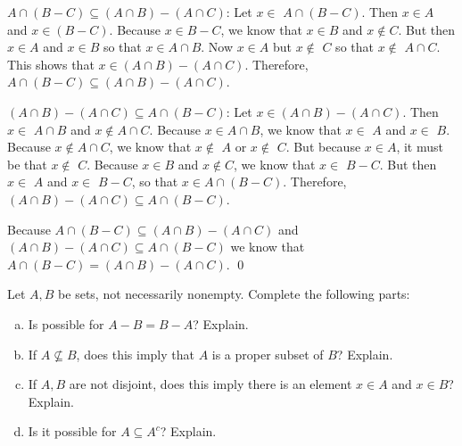 \documentclass[11pt,letterpaper]{article}
\newcommand{\ansun}[2]{\underline{\hspace{#1}#2\hspace{#1}}} %
\begin{document}
$A \cap (B - C) \subseteq (A \cap B) - (A \cap C)$: Let $x \in $ \ansun{0.45cm}{$A \cap (B - C)$}. Then \ansun{1.0cm}{$x \in A$} and \pspace \ansun{0.45cm}{$x \in (B - C)$}. Because $x \in B - C$, we know that \ansun{1.0cm}{$x \in B$} and \ansun{1cm}{$x \notin C$}. \pspace But then $x \in A$ and $x \in B$ so that \ansun{0.65cm}{$x \in A \cap B$}. Now $x \in A$ but $x \notin$ \ansun{1.35cm}{$C$} so that \pspace $x \notin$ \ansun{1cm}{$A \cap C$}. This shows that $x \in (A \cap B) - (A \cap C)$. Therefore, \ansun{0cm}{$A \cap (B - C) \subseteq (A \cap B) - (A \cap C)$}. 

$(A \cap B) - (A \cap C) \subseteq A \cap (B - C)$: Let $x \in (A \cap B) - (A \cap C)$. Then $x \in$ \ansun{1cm}{$A \cap B$} \pspace and $x \notin A \cap C$. Because $x \in A \cap B$, we know that $x \in$ \ansun{1.33cm}{$A$} and $x \in$ \ansun{1.33cm}{$B$}. \pspace Because $x \notin A \cap C$, we know that $x \notin$ \ansun{1.33cm}{$A$} or $x \notin$ \ansun{1.33cm}{$C$}. But because \pspace $x \in A$, it must be that $x \notin$ \ansun{1.33cm}{$C$}. Because $x \in B$ and $x \notin C$, we know that \pspace $x \in$ \ansun{0.95cm}{$B - C$}. But then $x \in$ \ansun{1.33cm}{$A$}  and $x \in$ \ansun{0.95cm}{$B - C$}, so that \pspace $x \in A \cap (B - C)$. Therefore, \ansun{0cm}{$(A \cap B) - (A \cap C) \subseteq A \cap (B - C)$}. 

Because \ansun{0cm}{$A \cap (B - C) \subseteq (A \cap B) - (A \cap C)$} and \ansun{0cm}{$(A \cap B) - (A \cap C) \subseteq A \cap (B - C)$} we know that \pspace $A \cap (B - C)= (A \cap B) - (A \cap C)$. \qed



\newpage



 Let $A, B$ be sets, not necessarily nonempty. Complete the following parts:
	\begin{enumerate}[(a)]
	\item Is possible for $A - B= B - A$? Explain. 
	\item If $A \not\subseteq B$, does this imply that $A$ is a proper subset of $B$? Explain. 
	\item If $A, B$ are not disjoint, does this imply there is an element $x \in A$ and $x \in B$? Explain.
	\item Is it possible for $A \subseteq A^c$? Explain. 
	\end{enumerate} \pspace
\end{document}

